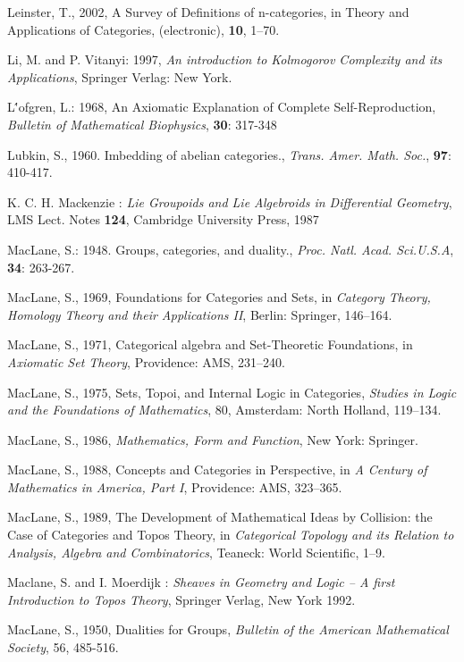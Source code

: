 \documentclass[12pt]{article}
\theoremstyle{plain}
\theoremstyle{definition}
\numberwithin{equation}{section}
\begin{document}
\begin{thebibliography}{199}
Leinster, T., 2002, A Survey of Definitions of n-categories, in {Theory and Applications of Categories}, (electronic), \textbf{10}, 1--70. 

Li, M. and P. Vitanyi: 1997, \emph{An introduction to Kolmogorov Complexity and its Applications}, Springer Verlag: New York.

L\''{o}fgren,  L.: 1968, An Axiomatic Explanation of Complete Self-Reproduction, \emph{Bulletin of Mathematical Biophysics}, \textbf{30}: 317-348

Lubkin, S., 1960. Imbedding of abelian categories.,  {\em Trans. Amer. Math. Soc.}, \textbf{97}: 410-417.


K. C. H. Mackenzie : {\em Lie Groupoids and Lie Algebroids in Differential Geometry}, LMS Lect. Notes \textbf{124}, Cambridge University Press, 1987

MacLane, S.: 1948. Groups, categories, and duality., {\em Proc. Natl. Acad. Sci.U.S.A}, \textbf{34}: 263-267.

MacLane, S., 1969, Foundations for Categories and Sets, in {\em Category Theory, Homology Theory and their Applications II}, Berlin: Springer, 146--164. 

MacLane, S., 1971, Categorical algebra and Set-Theoretic Foundations, in {\em Axiomatic Set Theory}, Providence: AMS, 231--240. 

MacLane, S., 1975, Sets, Topoi, and Internal Logic in Categories, {\em Studies in Logic and the Foundations of Mathematics}, 80, Amsterdam: North Holland, 119--134. 

MacLane, S., 1986, {\em Mathematics, Form and Function}, New York: Springer. 

MacLane, S., 1988, Concepts and Categories in Perspective, in {\em A Century of Mathematics in America, Part I}, Providence: AMS, 323--365. 

MacLane, S., 1989, The Development of Mathematical Ideas by Collision: the Case of Categories and Topos Theory, in {\em Categorical Topology and its Relation to Analysis, Algebra and Combinatorics}, Teaneck: World Scientific, 1--9.

Maclane, S. and I. Moerdijk : {\em Sheaves in Geometry and Logic -- A first Introduction to Topos Theory}, Springer Verlag, New York
1992. 

MacLane, S., 1950, Dualities for Groups, {\em Bulletin of the American Mathematical Society}, 56, 485-516. 


\end{thebibliography}
\end{document}
